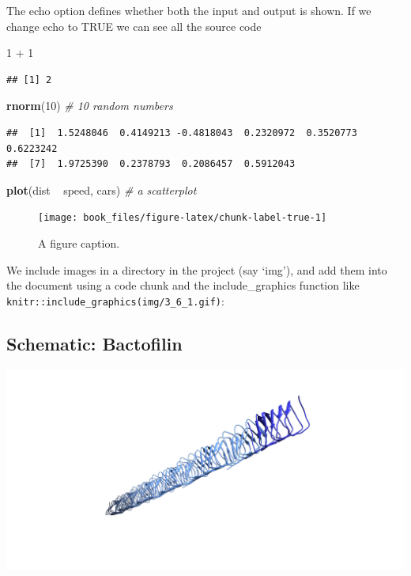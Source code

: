 \documentclass[]{tufte-book}
\newenvironment{Shaded}{}{}
\newcommand{\KeywordTok}[1]{\textcolor[rgb]{0.00,0.44,0.13}{\textbf{#1}}}
\newcommand{\DecValTok}[1]{\textcolor[rgb]{0.25,0.63,0.44}{#1}}
\newcommand{\StringTok}[1]{\textcolor[rgb]{0.25,0.44,0.63}{#1}}
\newcommand{\CommentTok}[1]{\textcolor[rgb]{0.38,0.63,0.69}{\textit{#1}}}
\newcommand{\OperatorTok}[1]{\textcolor[rgb]{0.40,0.40,0.40}{#1}}
\newcommand{\NormalTok}[1]{#1}
\begin{document}
The echo option defines whether both the input and output is shown. If
we change echo to TRUE we can see all the source code

\begin{Shaded}
\begin{Highlighting}[]
\DecValTok{1} \OperatorTok{+}\StringTok{ }\DecValTok{1}
\end{Highlighting}
\end{Shaded}

\begin{verbatim}
## [1] 2
\end{verbatim}

\begin{Shaded}
\begin{Highlighting}[]
\KeywordTok{rnorm}\NormalTok{(}\DecValTok{10}\NormalTok{)  }\CommentTok{# 10 random numbers}
\end{Highlighting}
\end{Shaded}

\begin{verbatim}
##  [1]  1.5248046  0.4149213 -0.4818043  0.2320972  0.3520773  0.6223242
##  [7]  1.9725390  0.2378793  0.2086457  0.5912043
\end{verbatim}

\begin{Shaded}
\begin{Highlighting}[]
\KeywordTok{plot}\NormalTok{(dist }\OperatorTok{~}\StringTok{ }\NormalTok{speed, cars)  }\CommentTok{# a scatterplot}
\end{Highlighting}
\end{Shaded}

\begin{figure}
\texttt{[image: book\_files/figure-latex/chunk-label-true-1]} \caption[A figure caption]{A figure caption.}\label{fig:chunk-label-true}
\end{figure}

We include images in a directory in the project (say `img'), and add
them into the document using a code chunk and the include\_graphics
function like
\texttt{knitr::include\_graphics(\textquotesingle{}img/3\_6\_1.gif\textquotesingle{})}:

\subsection*{Schematic: Bactofilin}\label{Bactofilin}

\includegraphics{img/3_6_1}
\end{document}
